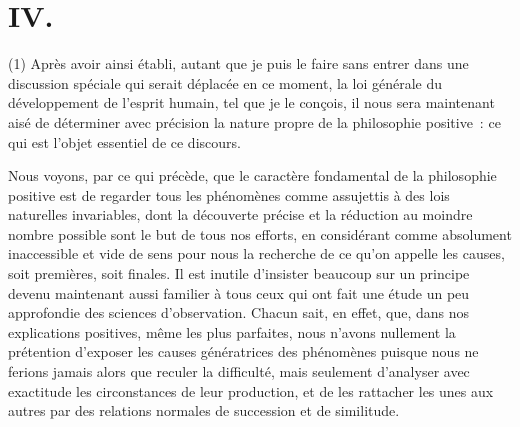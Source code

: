\documentclass[french,twoside]{book} %
\begin{document}
\section[{IV.}]{IV.}
\noindent (1) Après avoir ainsi établi, autant que je puis le faire sans entrer dans une discussion spéciale qui serait déplacée en ce moment, la loi générale du développement de l’esprit humain, tel que je le conçois, il nous sera maintenant aisé de déterminer avec précision la nature propre de la philosophie positive : ce qui est l’objet essentiel de ce discours.\par
Nous voyons, par ce qui précède, que le caractère fondamental de la philosophie positive est de regarder tous les phénomènes comme assujettis à des lois naturelles invariables, dont la découverte précise et la réduction au moindre nombre possible sont le but de tous nos efforts, en considérant comme absolument inaccessible et vide de sens pour nous la recherche de ce qu’on appelle les causes, soit premières, soit finales. Il est inutile d’insister beaucoup sur un principe devenu maintenant aussi familier à tous ceux qui ont fait une étude un peu approfondie des sciences d’observation. Chacun sait, en effet, que, dans nos explications positives, même les plus parfaites, nous n’avons nullement la prétention d’exposer les causes génératrices des phénomènes puisque nous ne ferions jamais alors que reculer la difficulté, mais seulement d’analyser avec exactitude les circonstances de leur production, et de les rattacher les unes aux autres par des relations normales de succession et de similitude.\par
\end{document}
